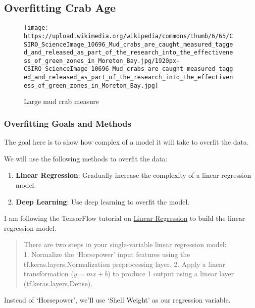 \documentclass[11pt]{article}
\providecommand{\tightlist}{%
      \setlength{\itemsep}{0pt}\setlength{\parskip}{0pt}}
\begin{document}
    \subsection{Overfitting Crab Age}\label{overfitting-crab-age}

\begin{figure}
\centering
\texttt{[image: https://upload.wikimedia.org/wikipedia/commons/thumb/6/65/CSIRO\_ScienceImage\_10696\_Mud\_crabs\_are\_caught\_measured\_tagged\_and\_released\_as\_part\_of\_the\_research\_into\_the\_effectiveness\_of\_green\_zones\_in\_Moreton\_Bay.jpg/1920px-CSIRO\_ScienceImage\_10696\_Mud\_crabs\_are\_caught\_measured\_tagged\_and\_released\_as\_part\_of\_the\_research\_into\_the\_effectiveness\_of\_green\_zones\_in\_Moreton\_Bay.jpg]}
\caption{Large mud crab measure}
\end{figure}

    \subsubsection{Overfitting Goals and
Methods}\label{overfitting-goals-and-methods}

The goal here is to show how complex of a model it will take to overfit
the data.

We will use the following methods to overfit the data:

\begin{enumerate}
\def\labelenumi{\arabic{enumi}.}
\tightlist
\item
  \textbf{Linear Regression}: Gradually increase the complexity of a
  linear regression model.
\item
  \textbf{Deep Learning}: Use deep learning to overfit the model.
\end{enumerate}

I am following the TensorFlow tutorial on
\href{https://www.tensorflow.org/tutorials/keras/regression\#linear_regression_with_one_variable}{Linear
Regression} to build the linear regression model.

\begin{quote}
There are two steps in your single-variable linear regression model:\\
1. Normalize the `Horsepower' input features using the
tf.keras.layers.Normalization preprocessing layer. 2. Apply a linear
transformation (\(y = mx + b\)) to produce 1 output using a linear layer
(tf.keras.layers.Dense).
\end{quote}

Instead of `Horsepower', we'll use `Shell Weight' as our regression
variable.
\end{document}

